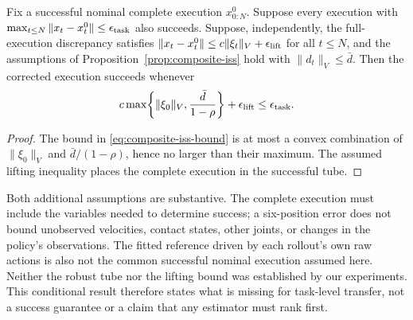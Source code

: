 \begin{proposition}
\label{prop:task-tube}
Fix a successful nominal complete execution $x^0_{0:N}$. Suppose every execution
with $\max_{t\le N}\|x_t-x_t^0\|\le\epsilon_{\rm task}$ also succeeds.
Suppose, independently, the full-execution discrepancy satisfies
$\|x_t-x_t^0\|\le c\|\xi_t\|_V+\epsilon_{\rm lift}$ for all $t\le N$, and
the assumptions of Proposition~\ref{prop:composite-iss} hold with
$\|d_t\|_V\le\bar d$. Then the corrected execution succeeds whenever
\begin{equation}
c\max\!\left\{\|\xi_0\|_V,\frac{\bar d}{1-\rho}\right\}
+\epsilon_{\rm lift}\le\epsilon_{\rm task}.
\end{equation}
\end{proposition}
\begin{proof}
The bound in \eqref{eq:composite-iss-bound} is at most a convex combination of
$\|\xi_0\|_V$ and $\bar d/(1-\rho)$, hence no larger than their maximum.
The assumed lifting inequality places the complete execution in the successful
tube.
\end{proof}

Both additional assumptions are substantive. The complete execution must include
the variables needed to determine success; a six-position error does not bound
unobserved velocities, contact states, other joints, or changes in the policy's
observations. The fitted reference driven by each rollout's own raw actions is
also not the common successful nominal execution assumed here. Neither the
robust tube nor the lifting bound was established by our experiments. This
conditional result therefore states what is missing for task-level transfer,
not a success guarantee or a claim that any estimator must rank first.
